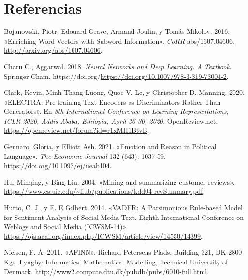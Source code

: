 \documentclass[
  12pt,
]{article}
\newlength{\cslhangindent}
\newlength{\cslentryspacingunit} %
\newenvironment{CSLReferences}[2] %
 {%
  \setlength{\parindent}{0pt}
  \ifodd #1
  \let\oldpar\par
  \def\par{\hangindent=\cslhangindent\oldpar}
  \fi
  \setlength{\parskip}{#2\cslentryspacingunit}
 }%
 {}
\begin{document}
\newpage

\hypertarget{referencias}{%
\section*{Referencias}\label{referencias}}

\hypertarget{refs}{}
\begin{CSLReferences}{1}{0}
\leavevmode{}%
Bojanowski, Piotr, Edouard Grave, Armand Joulin, y Tomás Mikolov. 2016.
{«Enriching Word Vectors with Subword Information»}. \emph{CoRR}
abs/1607.04606. \url{http://arxiv.org/abs/1607.04606}.

\leavevmode{}%
Charu C., Aggarwal. 2018. \emph{Neural Networks and Deep Learning. A
Textbook}. Springer Cham.
https://doi.org/\url{https://doi.org/10.1007/978-3-319-73004-2}.

\leavevmode{}%
Clark, Kevin, Minh-Thang Luong, Quoc V. Le, y Christopher D. Manning.
2020. {«{ELECTRA:} Pre-training Text Encoders as Discriminators Rather
Than Generators»}. En \emph{8th International Conference on Learning
Representations, {ICLR} 2020, Addis Ababa, Ethiopia, April 26-30, 2020}.
OpenReview.net. \url{https://openreview.net/forum?id=r1xMH1BtvB}.

\leavevmode{}%
Gennaro, Gloria, y Elliott Ash. 2021. {«{Emotion and Reason in Political
Language}»}. \emph{The Economic Journal} 132 (643): 1037-59.
\url{https://doi.org/10.1093/ej/ueab104}.

\leavevmode{}%
Hu, Minqing, y Bing Liu. 2004. {«Mining and summarizing customer
reviews»}.
\url{https://www.cs.uic.edu/~liub/publications/kdd04-revSummary.pdf}.

\leavevmode{}%
Hutto, C. J., y E. E Gilbert. 2014. {«VADER: A Parsimonious Rule-based
Model for Sentiment Analysis of Social Media Text. Eighth International
Conference on Weblogs and Social Media (ICWSM-14)»}.
\url{https://ojs.aaai.org/index.php/ICWSM/article/view/14550/14399}.

\leavevmode{}%
Nielsen, F. Å. 2011. {«AFINN»}. Richard Petersens Plads, Building 321,
{DK-}2800 Kgs. Lyngby: Informatics; Mathematical Modelling, Technical
University of Denmark.
\url{http://www2.compute.dtu.dk/pubdb/pubs/6010-full.html}.


\end{CSLReferences}
\end{document}
